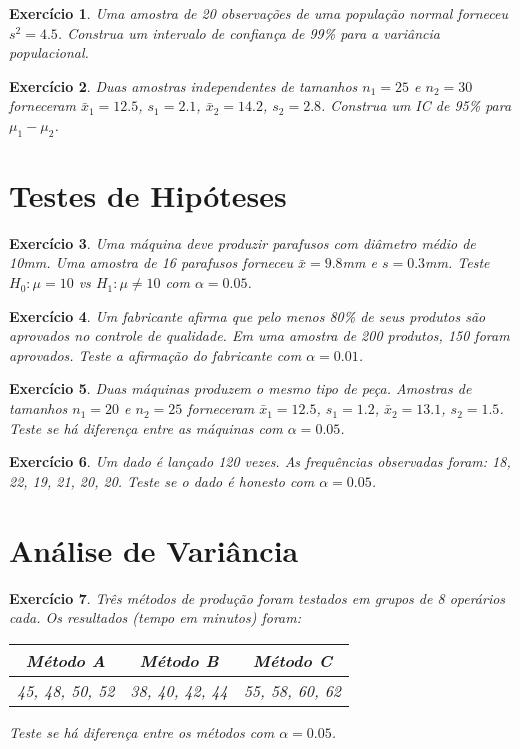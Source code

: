 \documentclass[12pt,a4paper]{article}
\newtheorem{exercise}{Exercício}
\begin{document}
\begin{exercise}
Uma amostra de 20 observações de uma população normal forneceu $s^2 = 4.5$. Construa um intervalo de confiança de 99\% para a variância populacional.
\end{exercise}

\begin{exercise}
Duas amostras independentes de tamanhos $n_1 = 25$ e $n_2 = 30$ forneceram $\bar{x}_1 = 12.5$, $s_1 = 2.1$, $\bar{x}_2 = 14.2$, $s_2 = 2.8$. Construa um IC de 95\% para $\mu_1 - \mu_2$.
\end{exercise}

\section{Testes de Hipóteses}

\begin{exercise}
Uma máquina deve produzir parafusos com diâmetro médio de 10mm. Uma amostra de 16 parafusos forneceu $\bar{x} = 9.8$mm e $s = 0.3$mm. Teste $H_0: \mu = 10$ vs $H_1: \mu \neq 10$ com $\alpha = 0.05$.
\end{exercise}

\begin{exercise}
Um fabricante afirma que pelo menos 80\% de seus produtos são aprovados no controle de qualidade. Em uma amostra de 200 produtos, 150 foram aprovados. Teste a afirmação do fabricante com $\alpha = 0.01$.
\end{exercise}

\begin{exercise}
Duas máquinas produzem o mesmo tipo de peça. Amostras de tamanhos $n_1 = 20$ e $n_2 = 25$ forneceram $\bar{x}_1 = 12.5$, $s_1 = 1.2$, $\bar{x}_2 = 13.1$, $s_2 = 1.5$. Teste se há diferença entre as máquinas com $\alpha = 0.05$.
\end{exercise}

\begin{exercise}
Um dado é lançado 120 vezes. As frequências observadas foram: 18, 22, 19, 21, 20, 20. Teste se o dado é honesto com $\alpha = 0.05$.
\end{exercise}

\section{Análise de Variância}

\begin{exercise}
Três métodos de produção foram testados em grupos de 8 operários cada. Os resultados (tempo em minutos) foram:
\begin{center}
\begin{tabular}{|c|c|c|}
\hline
Método A & Método B & Método C \\
\hline
45, 48, 50, 52 & 38, 40, 42, 44 & 55, 58, 60, 62 \\
\hline
\end{tabular}
\end{center}
Teste se há diferença entre os métodos com $\alpha = 0.05$.
\end{exercise}
\end{document}
